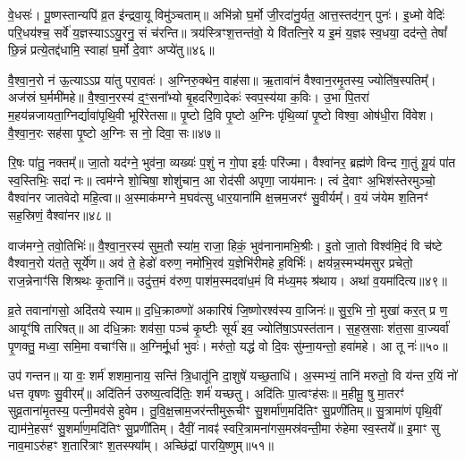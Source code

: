 वे॒धसः॑। पू॒ष्णस्तान्यपि॑ व्र॒त इ॑न्द्रवा॒यू विमु॑ञ्चताम्॥ अभि॑न्नो घ॒र्मो जी॒रदा॑नु॒र्यत॒ आत्त॒स्तद॑ग॒न् पुनः॑। इ॒ध्मो वेदिः॑ परि॒धय॑श्च॒ सर्वे॑ य॒ज्ञस्या\-ऽ\-ऽयु॒रनु॒ सं च॑रन्ति॥ त्रय॑स्त्रिꣳश॒त्तन्त॑वो॒ ये वि॑तत्नि॒रे य इ॒मं य॒ज्ञꣴ स्व॒धया॒ दद॑न्ते॒ तेषां᳚ छि॒न्नं प्रत्ये॒तद्द॑धामि॒ स्वाहा॑ घ॒र्मो दे॒वाꣳ अप्ये॑तु॥४६॥

{}

वै॒श्वा॒न॒रो न॑ ऊ॒त्या\-ऽ\-ऽप्र या॑तु परा॒वतः॑। अ॒ग्निरु॒क्थेन॒ वाह॑सा॥ ऋ॒तावा॑नं वैश्वान॒रमृ॒तस्य॒ ज्योति॑ष॒स्पतिम्᳚। अज॑स्रं घ॒र्ममी॑महे॥ वै॒श्वा॒न॒रस्य॑ द॒ꣳ॒सना᳚भ्यो बृ॒हदरि॑णा॒देकः॑ स्वप॒स्य॑या क॒विः। उ॒भा पि॒तरा॑ म॒हय॑न्नजायता॒ग्निर्द्यावा॑पृथि॒वी भूरि॑रेतसा॥ पृ॒ष्टो दि॒वि पृ॒ष्टो अ॒ग्निः पृ॑थि॒व्यां पृ॒ष्टो विश्वा॒ ओष॑धी॒रा वि॑वेश। वै॒श्वा॒न॒रः सह॑सा पृ॒ष्टो अ॒ग्निः स नो॒ दिवा॒ सः॥४७॥

रि॒षः पा॑तु॒ नक्तम्᳚॥ जा॒तो यद॑ग्ने॒ भुव॑ना॒ व्यख्यः॑ प॒शुं न गो॒पा इर्यः॒ परि॑ज्मा। वैश्वा॑नर॒ ब्रह्म॑णे विन्द गा॒तुं यू॒यं पा॑त स्व॒स्तिभिः॒ सदा॑ नः॥ त्वम॑ग्ने शो॒चिषा॒ शोशु॑चान॒ आ रोद॑सी अपृणा॒ जाय॑मानः। त्वं दे॒वाꣳ अ॒भिश॑स्तेरमुञ्चो॒ वैश्वा॑नर जातवेदो महि॒त्वा॥ अ॒स्माक॑मग्ने म॒घव॑त्सु धार॒याना॑मि क्ष॒त्त्रम॒जरꣳ॑ सु॒वीर्यम्᳚। व॒यं ज॑येम श॒तिनꣳ॑ सह॒स्रिणं॒ वैश्वा॑नर॥४८॥

वाज॑मग्ने॒ तवो॒तिभिः॑॥ वै॒श्वा॒न॒रस्य॑ सुम॒तौ स्या॑म॒ राजा॒ हिकं॒ भुव॑नानामभि॒श्रीः। इ॒तो जा॒तो विश्व॑मि॒दं वि च॑ष्टे वैश्वान॒रो य॑तते॒ सूर्ये॑ण॥ अव॑ ते॒ हेडो॑ वरुण॒ नमो॑भि॒रव॑ य॒ज्ञेभि॑रीमहे ह॒विर्भिः॑। क्षय॑न्न॒स्मभ्य॑मसुर प्रचेतो॒ राज॒न्नेनाꣳ॑सि शिश्रथः कृ॒तानि॑॥ उदु॑त्त॒मं व॑रुण॒ पाश॑म॒स्मदवा॑ध॒मं वि म॑ध्य॒मꣴ श्र॑थाय। अथा॑ व॒यमा॑दित्य॥४९॥

व्र॒ते तवाना॑गसो॒ अदि॑तये स्याम॥ द॒धि॒क्राव्ण्णो॑ अकारिषं जि॒ष्णोरश्व॑स्य वा॒जिनः॑॥ सु॒र॒भि नो॒ मुखा॑ कर॒त् प्र ण॒ आयूꣳ॑षि तारिषत्॥ आ द॑धि॒क्राः शव॑सा॒ पञ्च॑ कृ॒ष्टीः सूर्य॑ इव॒ ज्योति॑षा॒\-ऽपस्त॑तान। स॒ह॒स्र॒साः श॑त॒सा वा॒ज्यर्वा॑ पृ॒णक्तु॒ मध्वा॒ समि॒मा वचाꣳ॑सि॥ अ॒ग्निर्मू॒र्धा भुवः॑। मरु॑तो॒ यद्ध॑ वो दि॒वः सु॑म्ना॒यन्तो॒ हवा॑महे। आ तू नः॑॥५०॥

उप॑ गन्तन॥ या वः॒ शर्म॑ शशमा॒नाय॒ सन्ति॑ त्रि॒धातू॑नि दा॒शुषे॑ यच्छ॒ताधि॑। अ॒स्मभ्यं॒ तानि॑ मरुतो॒ वि य॑न्त र॒यिं नो॑ धत्त वृषणः सु॒वीरम्᳚॥ अदि॑तिर्न उरुष्य॒त्वदि॑तिः॒ शर्म॑ यच्छतु। अदि॑तिः पा॒त्वꣳह॑सः॥ म॒हीमू॒ षु मा॒तरꣳ॑ सुव्र॒ताना॑मृ॒तस्य॒ पत्नी॒मव॑से हुवेम। तु॒वि॒क्ष॒त्त्राम॒जर॑न्तीमुरू॒चीꣳ सु॒शर्मा॑ण॒मदि॑तिꣳ सु॒प्रणी॑तिम्॥ सु॒त्रामा॑णं पृथि॒वीं द्याम॑ने॒हसꣳ॑ सु॒शर्मा॑ण॒मदि॑तिꣳ सु॒प्रणी॑तिम्। दैवीं॒ नावꣴ॑ स्वरि॒त्रामना॑गस॒मस्र॑वन्ती॒मा रु॑हेमा स्व॒स्तये᳚॥ इ॒माꣳ सु नाव॒मा\-ऽरु॑हꣳ श॒तारि॑त्राꣳ श॒तस्फ्या᳚म्। अच्छि॑द्रां पारयि॒ष्णुम्॥५१॥

